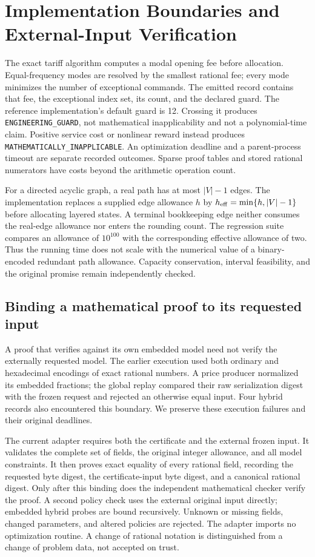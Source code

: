 \section{Implementation Boundaries and External-Input Verification}\label{sec:implementation63}
The exact tariff algorithm computes a modal opening fee before allocation. Equal-frequency modes are resolved by the smallest rational fee; every mode minimizes the number of exceptional commands. The emitted record contains that fee, the exceptional index set, its count, and the declared guard. The reference implementation's default guard is 12. Crossing it produces \texttt{ENGINEERING\_GUARD}, not mathematical inapplicability and not a polynomial-time claim. Positive service cost or nonlinear reward instead produces \texttt{MATHEMATICALLY\_INAPPLICABLE}. An optimization deadline and a parent-process timeout are separate recorded outcomes. Sparse proof tables and stored rational numerators have costs beyond the arithmetic operation count.

For a directed acyclic graph, a real path has at most $|V|-1$ edges. The implementation replaces a supplied edge allowance $h$ by $h_{\rm eff}=\min\{h,|V|-1\}$ before allocating layered states. A terminal bookkeeping edge neither consumes the real-edge allowance nor enters the rounding count. The regression suite compares an allowance of $10^{100}$ with the corresponding effective allowance of two. Thus the running time does not scale with the numerical value of a binary-encoded redundant path allowance. Capacity conservation, interval feasibility, and the original promise remain independently checked.

\subsection{Binding a mathematical proof to its requested input}\label{sec:binding63}
A proof that verifies against its own embedded model need not verify the externally requested model. The earlier execution used both ordinary and hexadecimal encodings of exact rational numbers. A price producer normalized its embedded fractions; the global replay compared their raw serialization digest with the frozen request and rejected an otherwise equal input. Four hybrid records also encountered this boundary. We preserve these execution failures and their original deadlines.

The current adapter requires both the certificate and the external frozen input. It validates the complete set of fields, the original integer allowance, and all model constraints. It then proves exact equality of every rational field, recording the requested byte digest, the certificate-input byte digest, and a canonical rational digest. Only after this binding does the independent mathematical checker verify the proof. A second policy check uses the external original input directly; embedded hybrid probes are bound recursively. Unknown or missing fields, changed parameters, and altered policies are rejected. The adapter imports no optimization routine. A change of rational notation is distinguished from a change of problem data, not accepted on trust.

